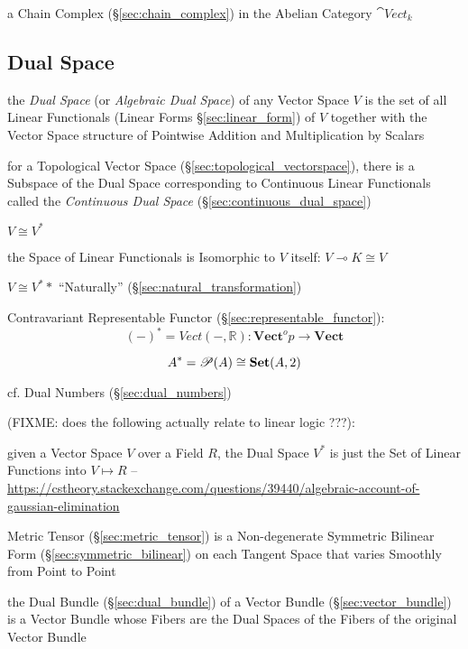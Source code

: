 a Chain Complex (\S\ref{sec:chain_complex}) in the Abelian Category
$\cat{Vect}_k$



\subsection{Dual Space}\label{sec:dual_space}

the \emph{Dual Space} (or \emph{Algebraic Dual Space}) of any Vector Space $V$
is the set of all Linear Functionals (Linear Forms \S\ref{sec:linear_form}) of
$V$ together with the Vector Space structure of Pointwise Addition and
Multiplication by Scalars

for a Topological Vector Space (\S\ref{sec:topological_vectorspace}), there is
a Subspace of the Dual Space corresponding to Continuous Linear Functionals
called the \emph{Continuous Dual Space} (\S\ref{sec:continuous_dual_space})

$V \cong V^*$

the Space of Linear Functionals is Isomorphic to $V$ itself:
$V \multimap K \cong V$

$V \cong V^**$ ``Naturally'' (\S\ref{sec:natural_transformation})

Contravariant Representable Functor
(\S\ref{sec:representable_functor}):
\[
  (-)^* = Vect(-,\mathbb{R}) :
    \mathbf{Vect}^op \rightarrow \mathbf{Vect}
\]

\[
  A^* = \mathscr{P}(A) \cong \mathbf{Set}(A,2)
\]\cite{awodey06}

cf. Dual Numbers (\S\ref{sec:dual_numbers})

(FIXME: does the following actually relate to linear logic ???):

given a Vector Space $V$ over a Field $R$, the Dual Space $V^*$ is just the Set
of Linear Functions into $V \mapsto R$
--\url{https://cstheory.stackexchange.com/questions/39440/algebraic-account-of-gaussian-elimination}

Metric Tensor (\S\ref{sec:metric_tensor}) is a Non-degenerate Symmetric Bilinear
Form (\S\ref{sec:symmetric_bilinear}) on each Tangent Space that varies Smoothly
from Point to Point

the Dual Bundle (\S\ref{sec:dual_bundle}) of a Vector Bundle
(\S\ref{sec:vector_bundle}) is a Vector Bundle whose Fibers are the Dual Spaces
of the Fibers of the original Vector Bundle



